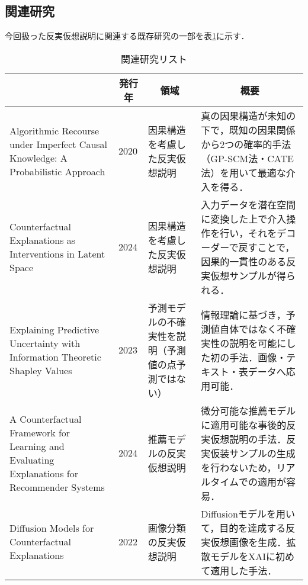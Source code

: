 \documentclass[dvipdfmx]{jreport}
\begin{document}
\subsection{関連研究}
今回扱った反実仮想説明に関連する既存研究の一部を表\ref{tab:related_work}に示す．
\begin{table}[h]
    \centering
    \caption{関連研究リスト}\label{tab:related_work}
    \begin{tabular}{|p{50mm}|p{10mm}|p{30mm}|p{60mm}|} \hline
        \rowcolor{gray!20}
        \multicolumn{1}{|c|}{\textbf{タイトル}} & \multicolumn{1}{c|}{\textbf{発行年}} & \multicolumn{1}{c|}{\textbf{領域}} & \multicolumn{1}{c|}{\textbf{概要}}  \\ \hline 
        Algorithmic Recourse under Imperfect Causal Knowledge: A Probabilistic Approach & 2020 & 因果構造を考慮した反実仮想説明 & 真の因果構造が未知の下で，既知の因果関係から2つの確率的手法（GP-SCM法・CATE法）を用いて最適な介入を得る． \\ \hline
        Counterfactual Explanations as Interventions in Latent Space & 2024 & 因果構造を考慮した反実仮想説明 & 入力データを潜在空間に変換した上で介入操作を行い，それをデコーダーで戻すことで，因果的一貫性のある反実仮想サンプルが得られる． \\ \hline
        Explaining Predictive Uncertainty with Information Theoretic Shapley Values & 2023 & 予測モデルの不確実性を説明（予測値の点予測ではない） & 情報理論に基づき，予測値自体ではなく不確実性の説明を可能にした初の手法．画像・テキスト・表データへ応用可能．\\ \hline
        A Counterfactual Framework for Learning and Evaluating Explanations for Recommender Systems & 2024 & 推薦モデルの反実仮想説明 & 微分可能な推薦モデルに適用可能な事後的反実仮想説明の手法．反実仮装サンプルの生成を行わないため，リアルタイムでの適用が容易． \\ \hline
        Diffusion Models for Counterfactual Explanations & 2022 & 画像分類の反実仮想説明 & Diffusionモデルを用いて，目的を達成する反実仮想画像を生成．拡散モデルをXAIに初めて適用した手法．\\ \hline
    \end{tabular}
\end{table}
\end{document}
